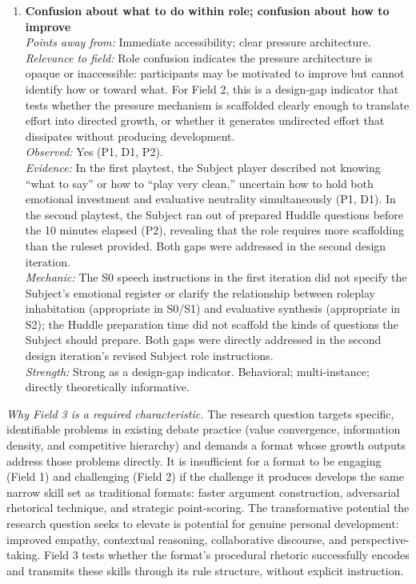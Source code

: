 \documentclass[12pt]{article}
\begin{document}
\begin{enumerate}
\item \textbf{Confusion about what to do within role; confusion about how to improve}\\
\textit{Points away from:} Immediate accessibility; clear pressure architecture.\\
\textit{Relevance to field:} Role confusion indicates the pressure architecture is opaque or inaccessible: participants may be motivated to improve but cannot identify how or toward what. For Field 2, this is a design-gap indicator that tests whether the pressure mechanism is scaffolded clearly enough to translate effort into directed growth, or whether it generates undirected effort that dissipates without producing development.\\
\textit{Observed:} Yes (P1, D1, P2).\\
\textit{Evidence:} In the first playtest, the Subject player described not knowing ``what to say'' or how to ``play very clean,'' uncertain how to hold both emotional investment and evaluative neutrality simultaneously (P1, D1). In the second playtest, the Subject ran out of prepared Huddle questions before the 10 minutes elapsed (P2), revealing that the role requires more scaffolding than the ruleset provided. Both gaps were addressed in the second design iteration.\\
\textit{Mechanic:} The S0 speech instructions in the first iteration did not specify the Subject's emotional register or clarify the relationship between roleplay inhabitation (appropriate in S0/S1) and evaluative synthesis (appropriate in S2); the Huddle preparation time did not scaffold the kinds of questions the Subject should prepare. Both gaps were directly addressed in the second design iteration's revised Subject role instructions.\\
\textit{Strength:} Strong as a design-gap indicator. Behavioral; multi-instance; directly theoretically informative.

\end{enumerate}

\bigskip


\noindent\textit{Why Field 3 is a required characteristic.} The research question targets specific, identifiable problems in existing debate practice (value convergence, information density, and competitive hierarchy) and demands a format whose growth outputs address those problems directly. It is insufficient for a format to be engaging (Field 1) and challenging (Field 2) if the challenge it produces develops the same narrow skill set as traditional formats: faster argument construction, adversarial rhetorical technique, and strategic point-scoring. The transformative potential the research question seeks to elevate is potential for genuine personal development: improved empathy, contextual reasoning, collaborative discourse, and perspective-taking. Field 3 tests whether the format's procedural rhetoric successfully encodes and transmits these skills through its rule structure, without explicit instruction.
\end{document}
